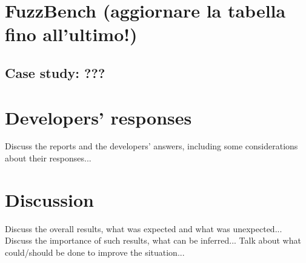 


\newpage
\section{FuzzBench (aggiornare la tabella fino all'ultimo!)}



\subsection{Case study: ???}

\newpage
\section{Developers' responses}
Discuss the reports and the developers' answers, including some considerations about their responses...

\newpage
\section{Discussion}
Discuss the overall results, what was expected and what was unexpected...
Discuss the importance of such results, what can be inferred...
Talk about what could/should be done to improve the situation...
